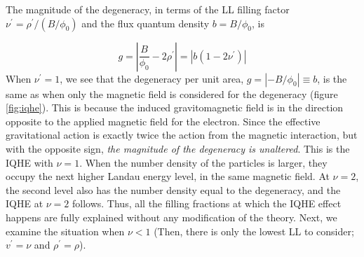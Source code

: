 \documentclass[aps,preprint,12pt,tightenlines]{revtex4}%
\begin{document}
The magnitude of the degeneracy, in terms of the LL filling factor $\nu^\prime
=\rho^\prime/\left(  B/\phi_{0}\right)  $ and the flux quantum density $b=B/\phi_{0}%
$, is%

\begin{equation}
g=\left\vert \frac{B}{\phi_{0}}-2\rho^\prime\right\vert =\left\vert b\left(
1-2\nu^\prime\right)  \right\vert \label{degeneracy}%
\end{equation}
When $\nu^\prime=1$, we see that the degeneracy per unit area, $g=\left\vert
-B/\phi_{0}\right\vert \equiv b$, is the same as when only the magnetic field
is considered for the degeneracy (figure \ref{fig:iqhe}). This is because the
induced gravitomagnetic field is in the direction opposite to the applied
magnetic field for the electron. Since the effective gravitational action is
exactly twice the action from the magnetic interaction, but with the opposite
sign, \emph{the magnitude of the degeneracy is unaltered}. This is the
IQHE with $\nu=1$. When the number density of the particles is larger, they
occupy the next higher Landau energy level, in the same magnetic field. At $\nu=2$,
the second level also has the number density equal to the degeneracy, and the
IQHE at $\nu=2$ follows. Thus, all the filling fractions at which the IQHE
effect happens are fully explained without any modification of the theory.
Next, we examine the situation when $\nu<1$ (Then, there is only the lowest LL to consider; $v^\prime=\nu$ and $\rho^\prime=\rho$).
\end{document}
